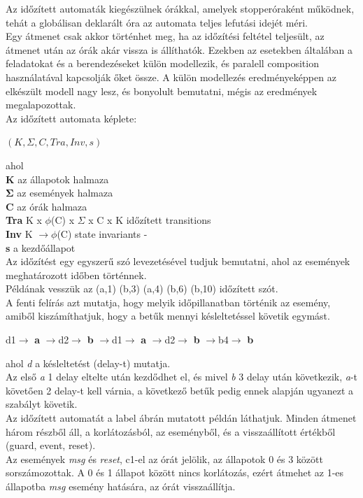 \documentclass [12pt]{report}
\begin{document}
Az időzített automaták kiegészülnek órákkal, amelyek stopperóraként működnek, tehát a globálisan deklarált óra az automata teljes lefutási idejét méri.\\
	Egy átmenet csak akkor történhet meg, ha az időzítési feltétel teljesült, az átmenet után az órák akár vissza is állíthatók. Ezekben az esetekben általában a feladatokat és a berendezéseket külön modellezik, és paralell composition használatával kapcsolják őket össze. A külön modellezés eredményeképpen az elkészült modell nagy lesz, és bonyolult bemutatni, mégis az eredmények megalapozottak. \\
Az időzített automata képlete:\\
\begin{center}
$(K, \Sigma, C, Tra, Inv, s)$\\
\end{center}
ahol\\
\indent \textbf{K} az állapotok halmaza\\
\indent $\mathbf{\Sigma}$ az események halmaza\\
\indent \textbf{C} az órák halmaza\\
\indent \textbf{Tra} K x $\phi$(C) x $ \Sigma $ x C x K időzített transitions\\
\indent \textbf{Inv} K $
\rightarrow  \phi$(C) state invariants -\\
\indent \textbf{s} a kezdőállapot \\
Az időzítést egy egyszerű szó levezetésével tudjuk bemutatni, ahol az események meghatározott időben történnek.\\
Példának vesszük az (a,1) (b,3) (a,4) (b,6) (b,10) időzített szót.\\
A fenti felírás azt mutatja, hogy melyik időpillanatban történik az esemény, amiből kiszámíthatjuk, hogy a betűk mennyi késleltetéssel követik egymást. 
\begin{center}
d1$\rightarrow$ \textbf{a} $\rightarrow$d2$\rightarrow$ \textbf{b} $\rightarrow$d1$\rightarrow$ \textbf{a} $\rightarrow$d2$\rightarrow$ \textbf{b} $\rightarrow$b4$\rightarrow$ \textbf{b}
\end{center}
ahol \emph{d} a késleltetést (delay-t) mutatja.\\
Az első \emph{a} 1 delay eltelte után kezdődhet el, és mivel \emph{b} 3 delay után következik, \emph{a}-t követően 2 delay-t kell várnia, a következő betűk pedig ennek alapján ugyanezt a szabályt követik.\\
Az időzített automatát a label ábrán mutatott példán láthatjuk. Minden átmenet három részből áll, a korlátozásból, az eseményből, és a visszaállított értékből (guard, event, reset). \\
Az események \emph{msg} és \emph{reset}, c1-el az órát jelölik, az állapotok 0 és 3 között sorszámozottak. A 0 és 1 állapot között nincs korlátozás, ezért átmehet az 1-es állapotba \emph{msg} esemény hatására, az órát visszaállítja. \cite{Behrmann2005} \cite{Panek2008}\\
\end{document}
